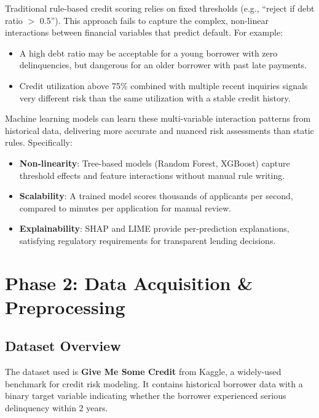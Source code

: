 \documentclass[12pt, a4paper]{article}
\begin{document}
Traditional rule-based credit scoring relies on fixed thresholds (e.g., ``reject if debt ratio $>$ 0.5''). This approach fails to capture the complex, non-linear interactions between financial variables that predict default. For example:

\begin{itemize}[noitemsep]
    \item A high debt ratio may be acceptable for a young borrower with zero delinquencies, but dangerous for an older borrower with past late payments.
    \item Credit utilization above 75\% combined with multiple recent inquiries signals very different risk than the same utilization with a stable credit history.
\end{itemize}

Machine learning models can learn these multi-variable interaction patterns from historical data, delivering more accurate and nuanced risk assessments than static rules. Specifically:

\begin{itemize}[noitemsep]
    \item \textbf{Non-linearity}: Tree-based models (Random Forest, XGBoost) capture threshold effects and feature interactions without manual rule writing.
    \item \textbf{Scalability}: A trained model scores thousands of applicants per second, compared to minutes per application for manual review.
    \item \textbf{Explainability}: SHAP and LIME provide per-prediction explanations, satisfying regulatory requirements for transparent lending decisions.
\end{itemize}

\newpage


\section{Phase 2: Data Acquisition \& Preprocessing}

\subsection{Dataset Overview}

The dataset used is \textbf{Give Me Some Credit} from Kaggle, a widely-used benchmark for credit risk modeling. It contains historical borrower data with a binary target variable indicating whether the borrower experienced serious delinquency within 2 years.
\end{document}
